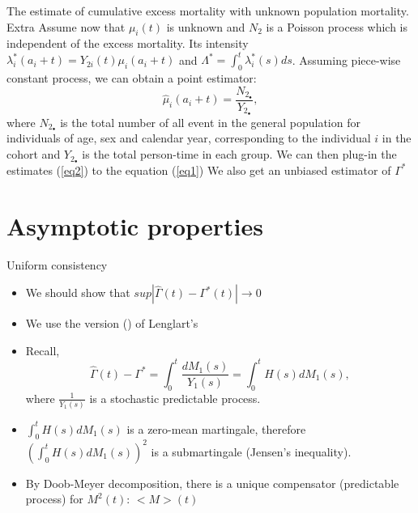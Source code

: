 \documentclass{beamer}
\begin{document}
\begin{frame}{The estimate of cumulative excess mortality with unknown population mortality. Extra}
Assume now that $\mu_i(t)$ is unknown and $N_2$ is a Poisson process which is independent of the excess mortality. 
\newline
Its intensity $\lambda^*_i(a_i+t)=Y_{2i}(t)\mu_i(a_i+t)$ and $\Lambda^* = \int_0^t \lambda^*_i(s)ds$.
Assuming piece-wise constant process, we can obtain a point estimator:
\begin{equation}
\label{eq2}
    \hat \mu_i(a_i+t) = \frac{N_2_{\bullet}}{Y_2_{\bullet}},
\end{equation}
 \newline
 where $N_2_{\bullet}$ is the total number of all event in the general population for individuals of age, sex and calendar year, corresponding to the individual $i$ in the cohort and $Y_2_{\bullet}$ is the total person-time in each group.
 \newline
We can then plug-in the estimates (\ref{eq2}) to the equation (\ref{eq1}) 
\newline
We also get an unbiased estimator of $\Gamma^*$

 \end{frame}



\section{Asymptotic properties}
\begin{frame}{Uniform consistency}
\begin{itemize}
\item We should show that $sup|\hat\Gamma(t) - \Gamma^*(t)| \rightarrow 0$  
\item We use the version (\cite{andersen}) of Lenglart's 
\item Recall, $$\hat\Gamma(t) - \Gamma^* = \int_0^t \frac{dM_1(s)}{Y_1(s)} = \int_0^t H(s) dM_1(s),$$
where $\frac{1}{Y_1(s)}$ is a stochastic predictable process.
\item $\int_0^t H(s) dM_1(s)$ is a zero-mean martingale, therefore $(\int_0^t H(s) dM_1(s))^2$ is a submartingale (Jensen's inequality).
\item By Doob-Meyer decomposition, there is a unique compensator (predictable process) for $M^2(t)$: $<M>(t)$
\end{itemize}
 \end{frame}
 
\end{document}
